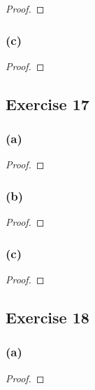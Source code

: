 \documentclass[14pt]{extarticle}
\begin{document}
\begin{proof}

\end{proof}

\subsubsection{(c)}

\begin{proof}

\end{proof}

\subsection{Exercise 17}
\subsubsection{(a)}

\begin{proof}

\end{proof}

\subsubsection{(b)}

\begin{proof}

\end{proof}

\subsubsection{(c)}

\begin{proof}

\end{proof}

\subsection{Exercise 18}

\subsubsection{(a)}

\begin{proof}

\end{proof}
\end{document}
